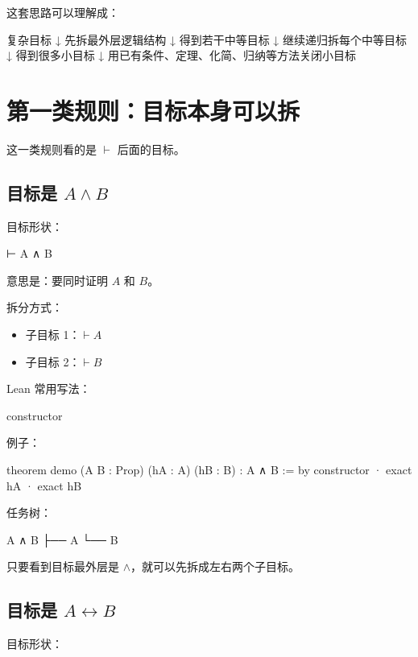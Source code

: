 \documentclass[UTF8,12pt]{ctexart}
\begin{document}
这套思路可以理解成：

\begin{Tree}
复杂目标
 ↓
先拆最外层逻辑结构
 ↓
得到若干中等目标
 ↓
继续递归拆每个中等目标
 ↓
得到很多小目标
 ↓
用已有条件、定理、化简、归纳等方法关闭小目标
\end{Tree}

\section{第一类规则：目标本身可以拆}

这一类规则看的是 \(\vdash\) 后面的目标。

\subsection{目标是 \(A \land B\)}

目标形状：

\begin{LeanCode}
⊢ A ∧ B
\end{LeanCode}

意思是：要同时证明 \(A\) 和 \(B\)。

拆分方式：
\begin{itemize}
  \item 子目标 1：\(\vdash A\)
  \item 子目标 2：\(\vdash B\)
\end{itemize}

Lean 常用写法：

\begin{LeanCode}
constructor
\end{LeanCode}

例子：

\begin{LeanCode}
theorem demo
  (A B : Prop)
  (hA : A)
  (hB : B) :
  A ∧ B := by
  constructor
  · exact hA
  · exact hB
\end{LeanCode}

任务树：

\begin{Tree}
A ∧ B
├── A
└── B
\end{Tree}

只要看到目标最外层是 \(\land\)，就可以先拆成左右两个子目标。

\subsection{目标是 \(A \leftrightarrow B\)}

目标形状：
\end{document}
